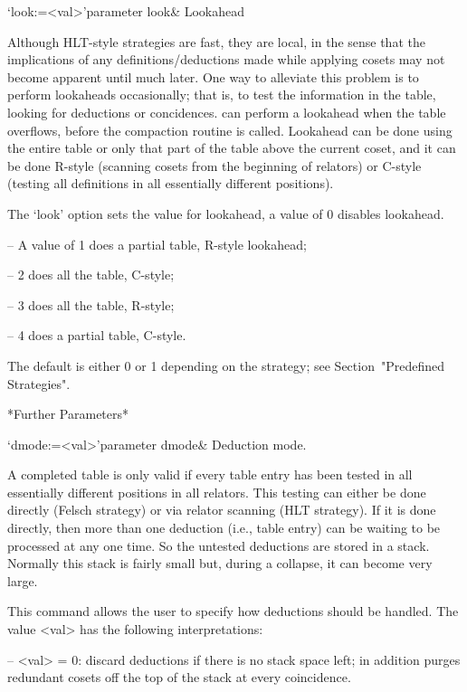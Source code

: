 \>`look:=<val>'{parameter look}&
Lookahead
  
Although HLT-style strategies  are fast, they are local,  in the sense
that  the  implications   of  any  definitions/deductions  made  while
applying cosets may not become  apparent until much later.  One way to
alleviate this problem is to perform lookaheads occasionally; that is,
to  test the  information  in  the table,  looking  for deductions  or
concidences.  {\ACE} can perform a lookahead when the table overflows,
before the compaction routine is  called.  Lookahead can be done using
the entire  table or  only that  part of the  table above  the current
coset, and it can be  done R-style (scanning cosets from the beginning
of relators)  or C-style (testing  all definitions in  all essentially
different positions).

The `look' option sets the value for lookahead, a value of 0 disables
lookahead.

\beginlist

\item{--} A value of 1 does a partial table, R-style lookahead; 
\item{--} 2 does all the table, C-style; 
\item{--} 3 does all the table, R-style; 
\item{--} 4 does a partial table, C-style.  

\endlist

The  default  is  either  0  or  1  depending  on  the  strategy;  see
Section~"Predefined Strategies".

*Further Parameters*

\>`dmode:=<val>'{parameter dmode}&
Deduction mode.

A completed table  is only valid if every table  entry has been tested
in all essentially different  positions in all relators.  This testing
can either be done directly  (Felsch strategy) or via relator scanning
(HLT strategy).  If it is  done directly, then more than one deduction
(i.e., table  entry) can be waiting  to be processed at  any one time.
So the untested deductions are stored in a stack.  Normally this stack
is fairly small but, during a collapse, it can become very large.

This  command allows  the user  to  specify how  deductions should  be
handled.  The value <val> has the following interpretations:

\beginlist

\item{--} <val>  = $0$:  
discard deductions if there is no stack space left; in addition purges
redundant cosets off the top of the stack at every coincidence.

